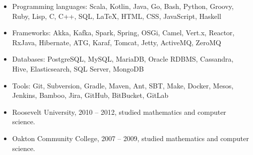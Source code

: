 \documentclass{harnon-cv}
\begin{document}
\stoptimeline

\begin{itemize}
    \item Programming languages: Scala, Kotlin, Java, Go, Bash, Python, Groovy, Ruby, Lisp, C, C++, SQL, \LaTeX, HTML, CSS, JavaScript, Haskell
    \item Frameworks: Akka, Kafka, Spark, Spring, OSGi, Camel, Vert.x, Reactor, RxJava, Hibernate, ATG, Karaf, Tomcat, Jetty, ActiveMQ, ZeroMQ
    \item Databases: PostgreSQL, MySQL, MariaDB, Oracle RDBMS, Cassandra, Hive, Elasticsearch, SQL Server, MongoDB
    \item Tools: Git, Subversion, Gradle, Maven, Ant, SBT, Make, Docker, Mesos, Jenkins, Bamboo, Jira, GitHub, BitBucket, GitLab
\end{itemize}


\begin{itemize}
    \item Roosevelt University, 2010 -- 2012, studied mathematics and computer science.
    \item Oakton Community College, 2007 -- 2009, studied mathematics and computer science.
\end{itemize}
\end{document}

